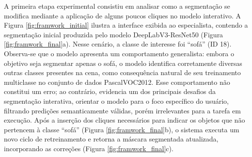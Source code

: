 A primeira etapa experimental consistiu em analisar como a segmentação se modifica mediante a aplicação de alguns poucos cliques no modelo interativo. A Figura \ref{fig:framwork_initial} ilustra a interface exibida ao especialista, contendo a segmentação inicial produzida pelo modelo DeepLabV3-ResNet50 (Figura \ref{fig:framwork_final}a). Nesse cenário, a classe de interesse foi ``sofá'' (ID 18). Observa-se que o modelo apresenta um comportamento generalista: embora o objetivo seja segmentar apenas o sofá, o modelo identifica corretamente diversas outras classes presentes na cena, como consequência natural de seu treinamento multiclasse no conjunto de dados \ac{PascalVOC2012}. Esse comportamento não constitui um erro; ao contrário, evidencia um dos principais desafios da segmentação interativa, orientar o modelo para o foco específico do usuário, filtrando predições semanticamente válidas, porém irrelevantes para a tarefa em execução.
Após a inserção dos cliques necessários para indicar os objetos que não pertencem à classe ``sofá'' (Figura \ref{fig:framwork_final}b), o sistema executa um novo ciclo de retreinamento e retorna a máscara segmentada atualizada, incorporando as correções (Figura \ref{fig:framwork_final}c).


